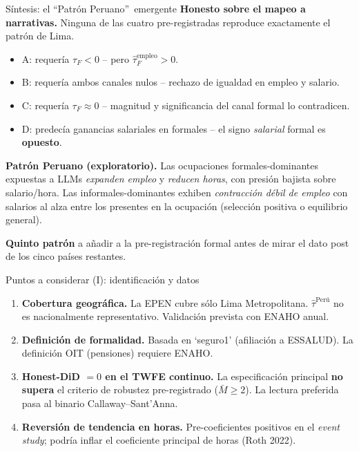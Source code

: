 \documentclass[aspectratio=169,11pt]{beamer}
\newcommand{\callout}[2][pblue]{%
  \begin{center}
  \begin{minipage}{0.95\linewidth}
    \setlength{\fboxsep}{0.7em}%
    \colorbox{#1!8}{%
      \begin{minipage}{\dimexpr\linewidth-1.4em}%
        \color{pdark}#2%
      \end{minipage}%
    }%
  \end{minipage}
  \end{center}
}
\newcommand{\cit}[1]{\textcolor{pgray}{\small(#1)}}
\begin{document}
\begin{frame}{Síntesis: el \textquotedblleft Patrón Peruano\textquotedblright\ emergente}
\footnotesize
\vspace{0.1em}
\textbf{Honesto sobre el mapeo a narrativas.} Ninguna de las cuatro pre-registradas reproduce exactamente el patrón de Lima.

\vspace{0.3em}
\begin{itemize}\setlength\itemsep{0.10em}
  \item A: requería $\tau_F < 0$ -- pero $\hat\tau_F^{\text{empleo}}>0$.
  \item B: requería ambos canales nulos -- rechazo de igualdad en empleo y salario.
  \item C: requería $\tau_F\approx 0$ -- magnitud y significancia del canal formal lo contradicen.
  \item D: predecía ganancias salariales en formales -- el signo \emph{salarial} formal es \textbf{opuesto}.
\end{itemize}

\vspace{0.3em}
\callout{\textbf{Patrón Peruano (exploratorio).} Las ocupaciones formales-dominantes expuestas a LLMs \emph{expanden empleo} y \emph{reducen horas}, con presión bajista sobre salario/hora. Las informales-dominantes exhiben \emph{contracción débil de empleo} con salarios al alza entre los presentes en la ocupación (selección positiva o equilibrio general).}

\vspace{0.2em}
{\normalsize\textbf{Quinto patrón} a añadir a la pre-registración formal antes de mirar el dato post de los cinco países restantes.}
\end{frame}

\begin{frame}{Puntos a considerar (I): identificación y datos}
\footnotesize
\vspace{0.2em}
\begin{enumerate}\setlength\itemsep{0.35em}
  \item \textbf{Cobertura geográfica.} La EPEN cubre sólo Lima Metropolitana. $\hat\tau^{\text{Perú}}$ no es nacionalmente representativo. Validación prevista con ENAHO anual.
  \item \textbf{Definición de formalidad.} Basada en `seguro1' (afiliación a ESSALUD). La definición OIT (pensiones) requiere ENAHO.
  \item \textbf{Honest-DiD $= 0$ en el TWFE continuo.} La especificación principal \textbf{no supera} el criterio de robustez pre-registrado ($\bar{M}\geq 2$). La lectura preferida pasa al binario Callaway--Sant'Anna.
  \item \textbf{Reversión de tendencia en horas.} Pre-coeficientes positivos en el \emph{event study}; podría inflar el coeficiente principal de horas \cit{Roth 2022}.
\end{enumerate}
\end{frame}
\end{document}
